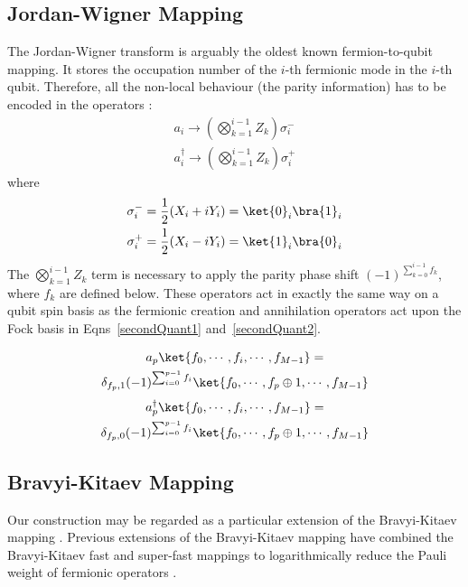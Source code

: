 \subsection{Jordan-Wigner Mapping}
\label{section:jordan-wigner}
The Jordan-Wigner transform \cite{jordan1993paulische} is arguably the oldest known fermion-to-qubit mapping. It stores the occupation number of the $i$-th fermionic mode in the $i$-th qubit. Therefore, all the non-local behaviour (the parity information) has to be encoded in the operators \cite{chiew2021optimal}:
\begin{align}
        a_i \rightarrow \left( \bigotimes_{k=1}^{i-1} Z_k \right) \sigma_i^-\\
        a^{\dagger}_i \rightarrow \left( \bigotimes_{k=1}^{i-1} Z_k \right) \sigma_i^+
\end{align}
where
\begin{align}
        \sigma^-_i = \frac{1}{2} (X_i + i Y_i) = \ket{0}_i \bra{1}_i\\
        \sigma^+_i = \frac{1}{2} (X_i - i Y_i) = \ket{1}_i \bra{0}_i 
\end{align}
The $\bigotimes_{k=1}^{i-1} Z_k$ term is necessary to apply the parity phase shift $(-1)^{\sum_{k=0}^{i-1} f_k}$, where $f_k$ are defined below. These operators act in exactly the same way on a qubit spin basis as the fermionic creation and annihilation operators act upon the Fock basis in Eqns~\eqref{secondQuant1} and~\eqref{secondQuant2}.

\begin{multline}
    \label{secondQuant1}
    a_p \ket{f_0,\cdots, f_i, \cdots, f_{M-1}} =\\ \delta_{f_p, 1} (-1)^{\sum_{i=0}^{p-1} f_i} \ket{f_0,\cdots, f_p \oplus 1, \cdots, f_{M-1}}
    \end{multline}
\begin{multline}
    \label{secondQuant2}
    a_p^{\dagger} \ket{f_0,\cdots, f_i, \cdots, f_{M-1}} =\\ \delta_{f_p, 0} (-1)^{\sum_{i=0}^{p-1} f_i}
    \ket{f_0,\cdots, f_p \oplus 1, \cdots, f_{M-1}}
    \end{multline}
\subsection{Bravyi-Kitaev Mapping}
\label{section:bravyi-kitaev}
Our construction may be regarded as a particular extension of the Bravyi-Kitaev mapping \cite{Bravyi_2002}. Previous extensions of the Bravyi-Kitaev mapping have combined the Bravyi-Kitaev fast and super-fast mappings to logarithmically reduce the Pauli weight of fermionic operators \cite{Setia_2019}.

